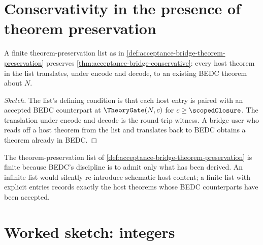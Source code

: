 \section{Conservativity in the presence of theorem preservation}
\label{sec:acceptance-bridge-conservativity}

\begin{theorem}
\label{thm:acceptance-bridge-theorem-preservation-conservative}
A finite theorem-preservation list as in \autoref{def:acceptance-bridge-theorem-preservation} preserves \autoref{thm:acceptance-bridge-conservative}: every host theorem in the list translates, under encode and decode, to an existing BEDC theorem about $N$.
\end{theorem}
\begin{proof}[Sketch]
The list's defining condition is that each host entry is paired with an accepted BEDC counterpart at $\TheoryGate(N, c)$ for $c \ge \scopedClosure$. The translation under encode and decode is the round-trip witness. A bridge user who reads off a host theorem from the list and translates back to BEDC obtains a theorem already in BEDC.
\end{proof}

\begin{remark}
\label{rem:acceptance-bridge-finite-list}
The theorem-preservation list of \autoref{def:acceptance-bridge-theorem-preservation} is finite because BEDC's discipline is to admit only what has been derived. An infinite list would silently re-introduce schematic host content; a finite list with explicit entries records exactly the host theorems whose BEDC counterparts have been accepted.
\end{remark}

\section{Worked sketch: integers}
\label{sec:acceptance-bridge-integers-sketch}

